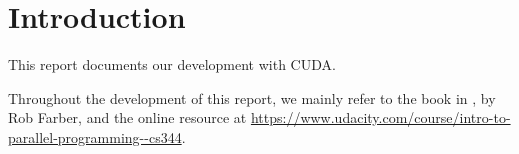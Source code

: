 \chapter{Introduction}
\label{chap:introduction}

This report documents our development with CUDA.

Throughout the development of this report, we mainly refer to the book in \cite{farber2011cuda}, by Rob Farber, and the online resource at \url{https://www.udacity.com/course/intro-to-parallel-programming--cs344}.
